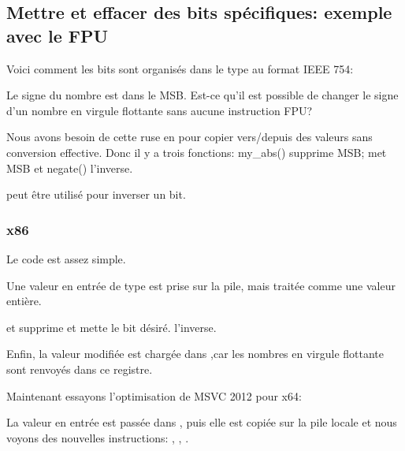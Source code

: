 \subsection{Mettre et effacer des bits spécifiques: exemple avec le \ac{FPU}}


Voici comment les bits sont organisés dans le type \Tfloat au format IEEE 754:



Le signe du nombre est dans le \ac{MSB}.
Est-ce qu'il est possible de changer le signe d'un nombre en virgule flottante sans
aucune instruction FPU?



Nous avons besoin de cette ruse en \CCpp pour copier vers/depuis des valeurs \Tfloat
sans conversion effective.
Donc il y a trois fonctions: my\_abs() supprime \ac{MSB};  met \ac{MSB}
et negate() l'inverse.

\XOR peut être utilisé pour inverser un bit.

\subsubsection{x86}

Le code est assez simple.



Une valeur en entrée de type \Tfloat est prise sur la pile, mais traitée comme une
valeur entière.

\AND et \OR supprime et mette le bit désiré.
\XOR l'inverse.

Enfin, la valeur modifiée est chargée dans ,car les nombres en virgule flottante
sont renvoyés dans ce registre.

Maintenant essayons l'optimisation de MSVC 2012 pour x64:




La valeur en entrée est passée dans , puis elle est copiée sur la pile locale
et nous voyons des nouvelles instructions: \BTR, \BTS, \BTC.

